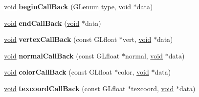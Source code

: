 \begin{DoxyCompactItemize}
\hyperlink{interfacevoid}{void} {\bfseries begin\+Call\+Back} (\hyperlink{interfacevoid}{G\+Lenum} type, \hyperlink{interfacevoid}{void} $\ast$data)
\item 
\mbox{\label{class_open_g_l_curve_evaluator_aa0f871f3bd64562abba60674f821bf96}} 
\hyperlink{interfacevoid}{void} {\bfseries end\+Call\+Back} (\hyperlink{interfacevoid}{void} $\ast$data)
\item 
\mbox{\label{class_open_g_l_curve_evaluator_acf25b2b1214391d90b771df0e91b13e6}} 
\hyperlink{interfacevoid}{void} {\bfseries vertex\+Call\+Back} (const G\+Lfloat $\ast$vert, \hyperlink{interfacevoid}{void} $\ast$data)
\item 
\mbox{\label{class_open_g_l_curve_evaluator_a6729d14b3688c55ce80beb0fb9e54394}} 
\hyperlink{interfacevoid}{void} {\bfseries normal\+Call\+Back} (const G\+Lfloat $\ast$normal, \hyperlink{interfacevoid}{void} $\ast$data)
\item 
\mbox{\label{class_open_g_l_curve_evaluator_a794004b09c8d17b3d721d4c1c5d1cba6}} 
\hyperlink{interfacevoid}{void} {\bfseries color\+Call\+Back} (const G\+Lfloat $\ast$color, \hyperlink{interfacevoid}{void} $\ast$data)
\item 
\mbox{\label{class_open_g_l_curve_evaluator_a8cde1827412259a98943605cf3f78046}} 
\hyperlink{interfacevoid}{void} {\bfseries texcoord\+Call\+Back} (const G\+Lfloat $\ast$texcoord, \hyperlink{interfacevoid}{void} $\ast$data)
\end{DoxyCompactItemize}
